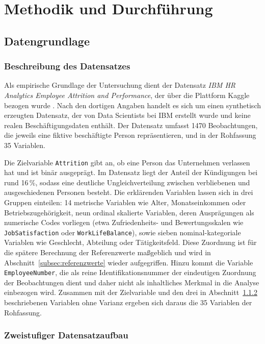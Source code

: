 \chapter{Methodik und Durchführung}
\label{ch:methodik}

\section{Datengrundlage}

\subsection{Beschreibung des Datensatzes}

Als empirische Grundlage der Untersuchung dient der Datensatz \textit{IBM HR Analytics Employee Attrition and Performance}, der über die Plattform Kaggle bezogen wurde \parencite{ibm_hr_analytics}. Nach den dortigen Angaben handelt es sich um einen synthetisch erzeugten Datensatz, der von Data Scientists bei IBM erstellt wurde und keine realen Beschäftigungsdaten enthält. Der Datensatz umfasst 1470 Beobachtungen, die jeweils eine fiktive beschäftigte Person repräsentieren, und in der Rohfassung 35 Variablen.

Die Zielvariable \texttt{Attrition} gibt an, ob eine Person das Unternehmen verlassen hat und ist binär ausgeprägt. Im Datensatz liegt der Anteil der Kündigungen bei rund 16\,\%, sodass eine deutliche Ungleichverteilung zwischen verbliebenen und ausgeschiedenen Personen besteht. Die erklärenden Variablen lassen sich in drei Gruppen einteilen: 14 metrische Variablen wie Alter, Monatseinkommen oder Betriebszugehörigkeit, neun ordinal skalierte Variablen, deren Ausprägungen als numerische Codes vorliegen (etwa Zufriedenheits- und Bewertungsskalen wie \texttt{JobSatisfaction} oder \texttt{WorkLifeBalance}), sowie sieben nominal-kategoriale Variablen wie Geschlecht, Abteilung oder Tätigkeitsfeld. Diese Zuordnung ist für die spätere Berechnung der Referenzwerte maßgeblich und wird in Abschnitt~\ref{subsec:referenzwerte} wieder aufgegriffen. Hinzu kommt die Variable \texttt{EmployeeNumber}, die als reine Identifikationsnummer der eindeutigen Zuordnung der Beobachtungen dient und daher nicht als inhaltliches Merkmal in die Analyse einbezogen wird. Zusammen mit der Zielvariable und den drei in Abschnitt~\ref{subsec:zeistufig} beschriebenen Variablen ohne Varianz ergeben sich daraus die 35 Variablen der Rohfassung.

\subsection{Zweistufiger Datensatzaufbau}
\label{subsec:zeistufig}

